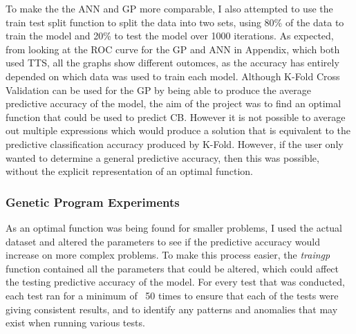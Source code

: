 \documentclass[11pt]{article}
\begin{document}
To make the the ANN and GP more comparable, I also attempted to use the train test split function to split the data into two sets, using 80\% of the data to train the model and 20\% to test the model over 1000 iterations.  As expected, from looking at the ROC curve for the GP and ANN in Appendix, which both used TTS, all the graphs show different outomces, as the accuracy has entirely depended on which data was used to train each model. 
Although K-Fold Cross Validation can be used for the GP by being able to produce the average predictive accuracy of the model, the aim of the project was to find an optimal function that could be used to predict CB. However it is not possible to average out multiple expressions which would produce a solution that is equivalent to the predictive classification accuracy produced by K-Fold. However, if the user only wanted to determine a general predictive accuracy, then this was possible, without the explicit representation of an optimal function. 
\subsubsection{Genetic Program Experiments}
As an optimal function was being found for smaller problems, I used the actual dataset and altered the parameters to see if the predictive accuracy would increase on more complex problems. To make this process easier, the \textit{train\textunderscore gp} function contained all the parameters that could be altered, which could affect the testing predictive accuracy of the model. For every test that was conducted, each test ran for a minimum of \
50 times to ensure that each of the tests were giving consistent results, and to identify any patterns and anomalies that may exist when running various tests.   \\
\end{document}
